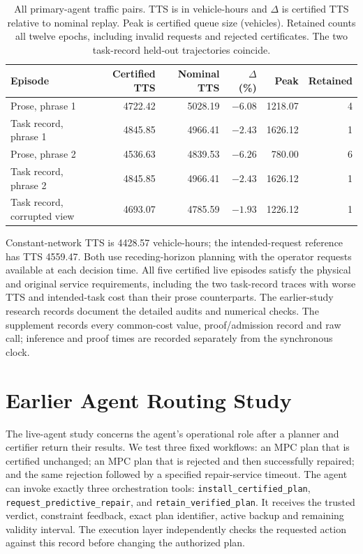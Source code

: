 \documentclass[preprint,12pt]{elsarticle}
\numberwithin{equation}{section}
\begin{document}
\begin{table}[t]
\centering\footnotesize
\caption{All primary-agent traffic pairs. TTS is in vehicle-hours and $\Delta$
is certified TTS relative to nominal replay. Peak is certified queue size
(vehicles). Retained counts all twelve epochs, including invalid requests
and rejected certificates. The two task-record held-out trajectories coincide.}
\label{tab:task-state-traffic}
\setlength{\tabcolsep}{3.5pt}
\begin{tabular}{@{}lrrrrr@{}}
\toprule
Episode & Certified TTS & Nominal TTS & $\Delta$ (\%) & Peak & Retained\\
\midrule
Prose, phrase 1 & 4722.42 & 5028.19 & $-6.08$ & 1218.07 & 4\\
Task record, phrase 1 & 4845.85 & 4966.41 & $-2.43$ & 1626.12 & 1\\
Prose, phrase 2 & 4536.63 & 4839.53 & $-6.26$ & 780.00 & 6\\
Task record, phrase 2 & 4845.85 & 4966.41 & $-2.43$ & 1626.12 & 1\\
Task record, corrupted view & 4693.07 & 4785.59 & $-1.93$ & 1226.12 & 1\\
\bottomrule
\end{tabular}
\end{table}

Constant-network TTS is 4428.57 vehicle-hours; the intended-request reference
has TTS 4559.47. Both use receding-horizon planning with the operator
requests available at each decision time. All five certified live episodes satisfy the physical and
original service requirements, including the two task-record traces with worse
TTS and intended-task cost than their prose counterparts. The earlier-study research records
document the detailed audits and numerical checks. The supplement
records every common-cost value, proof/admission record and raw call;
inference and proof times are recorded separately from the synchronous clock.

\FloatBarrier
\section{Earlier Agent Routing Study}
\label{app:earlier-agent-study}


The live-agent study concerns the agent's operational role after a planner and
certifier return their results. We test three fixed workflows: an MPC plan that is
certified unchanged; an MPC plan that is rejected and then successfully
repaired; and the same rejection followed by a specified repair-service
timeout. The agent can invoke exactly three orchestration tools:
\texttt{install\_certified\_plan},
\texttt{request\_predictive\_repair}, and
\texttt{retain\_verified\_plan}. It receives the trusted verdict, constraint feedback, exact plan identifier, active backup and remaining validity interval.
The execution layer independently checks the requested action against this
record before changing the authorized plan.
\end{document}
